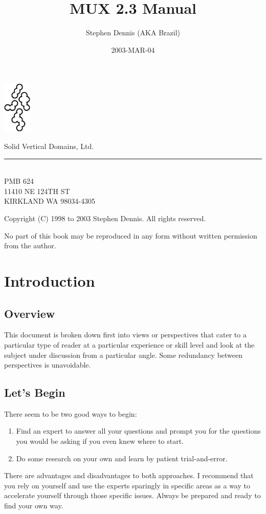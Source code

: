 \documentclass[dvips]{book}
\title{MUX 2.3 Manual}
\author{Stephen Dennis (AKA Brazil)}
\date{2003-MAR-04}
\begin{document}
\frontmatter
\maketitle

\begin{minipage}[t]{0.64in}
\includegraphics[height=0.98in]{latticeS.ps}
\end{minipage}
\begin{minipage}[t]{2.75in}
\vspace{-0.90in}
\LARGE{Solid Vertical Domains, Ltd.}\\
\rule{2.75in}{0.02in}\\
\normalsize PMB 624\\
11410 NE 124TH ST\\
KIRKLAND WA 98034-4305
\end{minipage}

Copyright (C) 1998 to 2003 Stephen Dennis. All rights reserved.

No part of this book may be reproduced in any form without written permission from the author.

\mainmatter
\chapter{Introduction}
\section{Overview}
This document is broken down first into views or perspectives that cater to a
particular type of reader at a particular experience or skill level and look
at the subject under discussion from a particular angle.
Some redundancy between perspectives is unavoidable.
\section{Let's Begin}
There seem to be two good ways to begin:
\begin{enumerate}
\item
Find an expert to answer all your questions and prompt you for the questions
you would be asking if you even knew where to start.
\item
Do some research on your own and learn by patient trial-and-error.
\end{enumerate}
There are advantages and disadvantages to both approaches. I recommend that
you rely on yourself and use the experts sparingly in specific areas as a way
to accelerate yourself through those specific issues. Always be prepared and
ready to find your own way.
\end{document}
